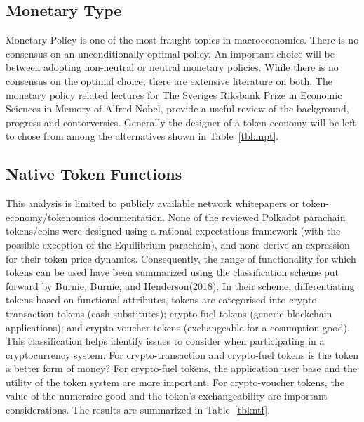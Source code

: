 \documentclass[11pt]{article}
\begin{document}
\begin{center}
\end{center}

\subsection{Monetary Type}
Monetary Policy is one of the most fraught topics in macroeconomics. There is no consensus on an unconditionally optimal policy. An important choice will be between adopting non-neutral or neutral monetary policies. While there is no consensus on the optimal choice, there are extensive literature on both. The monetary policy related lectures for The Sveriges Riksbank Prize in Economic Sciences in Memory of Alfred Nobel\autocite{nobel}, provide a useful review of the background, progress and contorversies. Generally the designer of a token-economy will be left to chose from among the alternatives shown in Table~\ref{tbl:mpt}.

\subsection{Native Token Functions}

This analysis is limited to publicly available network whitepapers or token-economy/tokenomics documentation. None of the reviewed Polkadot parachain tokens/coins were designed using a rational expectations framework (with the possible exception of the Equilibrium parachain), and none derive an expression for their token price dynamics. Consequently, the range of functionality for which tokens can be used have been summarized using the classification scheme put forward by Burnie, Burnie, and Henderson(2018)\autocite{burnie18}.  In their scheme, differentiating tokens based on functional attributes, tokens are categorised into crypto-transaction tokens (cash substitutes); crypto-fuel tokens (generic blockchain applications); and crypto-voucher tokens (exchangeable for a cosumption good). This classification helps identify issues to consider when participating in a cryptocurrency system.  For crypto-transaction and crypto-fuel tokens is the token a better form of money? For crypto-fuel tokens, the application user base and the utility of the token system are more important. For crypto-voucher tokens, the value of the numeraire good and the token’s exchangeability are important considerations.  The results are summarized in Table~\ref{tbl:ntf}.
\end{document}
